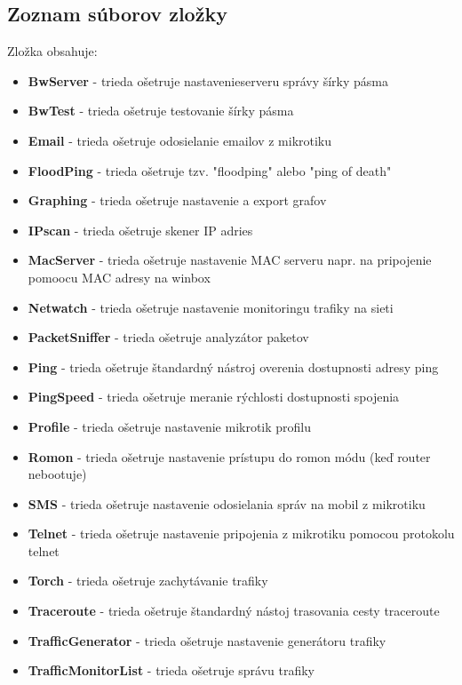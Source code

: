 \subsection{Zoznam súborov zložky}
Zložka obsahuje:
\begin{itemize}
\item \textbf{BwServer} - trieda ošetruje nastavenieserveru správy šírky pásma
\item \textbf{BwTest} - trieda ošetruje testovanie šírky pásma
\item \textbf{Email} - trieda ošetruje odosielanie emailov z mikrotiku
\item \textbf{FloodPing} - trieda ošetruje tzv. "floodping" alebo "ping of death"
\item \textbf{Graphing} - trieda ošetruje nastavenie a export grafov
\item \textbf{IPscan} - trieda ošetruje skener IP adries
\item \textbf{MacServer} - trieda ošetruje nastavenie MAC serveru napr. na pripojenie pomoocu MAC adresy na winbox
\item \textbf{Netwatch} - trieda ošetruje nastavenie monitoringu trafiky na sieti
\item \textbf{PacketSniffer} - trieda ošetruje analyzátor paketov
\item \textbf{Ping} - trieda ošetruje štandardný nástroj overenia dostupnosti adresy ping
\item \textbf{PingSpeed} - trieda ošetruje meranie rýchlosti dostupnosti spojenia
\item \textbf{Profile} - trieda ošetruje nastavenie mikrotik profilu
\item \textbf{Romon} - trieda ošetruje nastavenie prístupu do romon módu (keď router nebootuje)
\item \textbf{SMS} - trieda ošetruje nastavenie odosielania správ na mobil z mikrotiku
\item \textbf{Telnet} - trieda ošetruje nastavenie pripojenia z mikrotiku pomocou protokolu telnet
\item \textbf{Torch} - trieda ošetruje zachytávanie trafiky
\item \textbf{Traceroute} - trieda ošetruje štandardný nástoj trasovania cesty traceroute
\item \textbf{TrafficGenerator} - trieda ošetruje nastavenie generátoru trafiky
\item \textbf{TrafficMonitorList} - trieda ošetruje správu trafiky
\end{itemize}
